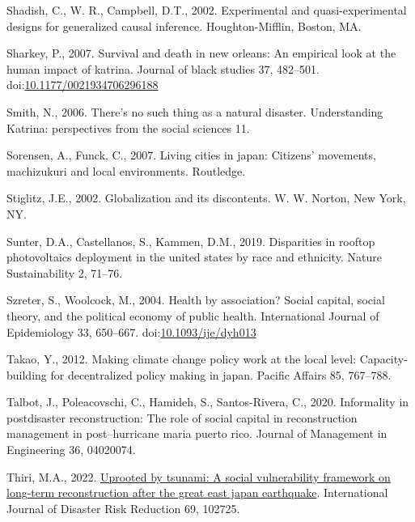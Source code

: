 \documentclass[]{elsarticle} %
\newlength{\cslhangindent}
\newlength{\cslentryspacingunit} %
\newenvironment{CSLReferences}[2] %
 {%
  \setlength{\parindent}{0pt}
  \ifodd #1
  \let\oldpar\par
  \def\par{\hangindent=\cslhangindent\oldpar}
  \fi
  \setlength{\parskip}{#2\cslentryspacingunit}
 }%
 {}
\begin{document}
\begin{CSLReferences}{1}{0}
\leavevmode{}%
Shadish, C., W. R., Campbell, D.T., 2002. Experimental and
quasi-experimental designs for generalized causal inference.
Houghton-Mifflin, Boston, MA.

\leavevmode{}%
Sharkey, P., 2007. Survival and death in new orleans: An empirical look
at the human impact of katrina. Journal of black studies 37, 482--501.
doi:\href{https://doi.org/10.1177/0021934706296188}{10.1177/0021934706296188}

\leavevmode{}%
Smith, N., 2006. There's no such thing as a natural disaster.
Understanding Katrina: perspectives from the social sciences 11.

\leavevmode{}%
Sorensen, A., Funck, C., 2007. Living cities in japan: Citizens'
movements, machizukuri and local environments. Routledge.

\leavevmode{}%
Stiglitz, J.E., 2002. Globalization and its discontents. W. W. Norton,
New York, NY.

\leavevmode{}%
Sunter, D.A., Castellanos, S., Kammen, D.M., 2019. Disparities in
rooftop photovoltaics deployment in the united states by race and
ethnicity. Nature Sustainability 2, 71--76.

\leavevmode{}%
Szreter, S., Woolcock, M., 2004. {Health by association? Social capital,
social theory, and the political economy of public health}.
International Journal of Epidemiology 33, 650--667.
doi:\href{https://doi.org/10.1093/ije/dyh013}{10.1093/ije/dyh013}

\leavevmode{}%
Takao, Y., 2012. Making climate change policy work at the local level:
Capacity-building for decentralized policy making in japan. Pacific
Affairs 85, 767--788.

\leavevmode{}%
Talbot, J., Poleacovschi, C., Hamideh, S., Santos-Rivera, C., 2020.
Informality in postdisaster reconstruction: The role of social capital
in reconstruction management in post--hurricane maria puerto rico.
Journal of Management in Engineering 36, 04020074.

\leavevmode{}%
Thiri, M.A., 2022.
\href{https://doi.org/10.1016/j.ijdrr.2021.102725}{Uprooted by tsunami:
A social vulnerability framework on long-term reconstruction after the
great east japan earthquake}. International Journal of Disaster Risk
Reduction 69, 102725.


\end{CSLReferences}
\end{document}
